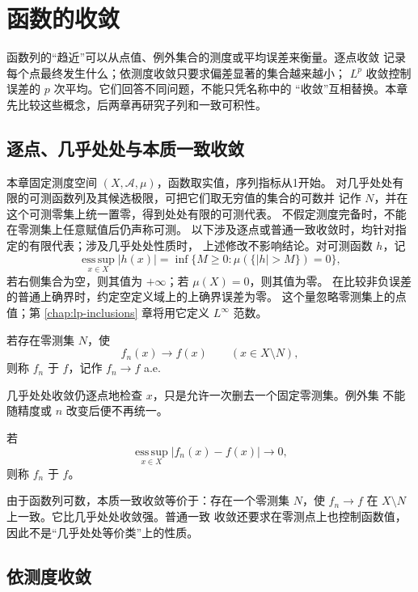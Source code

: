 \chapter{函数的收敛}
\label{chap:modes-of-convergence}

函数列的“趋近”可以从点值、例外集合的测度或平均误差来衡量。逐点收敛
记录每个点最终发生什么；依测度收敛只要求偏差显著的集合越来越小；
\(L^p\) 收敛控制误差的 \(p\) 次平均。它们回答不同问题，不能只凭名称中的
“收敛”互相替换。本章先比较这些概念，后两章再研究子列和一致可积性。

\section{逐点、几乎处处与本质一致收敛}

本章固定测度空间 \((X,\mathcal A,\mu)\)，函数取实值，序列指标从1开始。
对几乎处处有限的可测函数列及其候选极限，可把它们取无穷值的集合的可数并
记作 \(N\)，并在这个可测零集上统一置零，得到处处有限的可测代表。
不假定测度完备时，不能在零测集上任意赋值后仍声称可测。
以下涉及逐点或普通一致收敛时，均针对指定的有限代表；涉及几乎处处性质时，
上述修改不影响结论。对可测函数 \(h\)，记
\[
 \operatorname*{ess\,sup}_{x\in X}|h(x)|
 =\inf\{M\ge0:\mu(\{|h|>M\})=0\},
\]
若右侧集合为空，则其值为 \(+\infty\)；若 \(\mu(X)=0\)，则其值为零。
在比较非负误差的普通上确界时，约定空定义域上的上确界误差为零。
这个量忽略零测集上的点值；第
\ref{chap:lp-inclusions} 章将用它定义 \(L^\infty\) 范数。

\begin{definition}
若存在零测集 \(N\)，使
\[
 f_n(x)\longrightarrow f(x)\qquad(x\in X\setminus N),
\]
则称 \(f_n\) 于 \(f\)，记作
\(f_n\to f\) a.e.
\end{definition}

几乎处处收敛仍逐点地检查 \(x\)，只是允许一次删去一个固定零测集。例外集
不能随精度或 \(n\) 改变后便不再统一。

\begin{definition}
若
\[
 \operatorname*{ess\,sup}_{x\in X}|f_n(x)-f(x)|
 \longrightarrow0,
\]
则称 \(f_n\) 于 \(f\)。
\end{definition}

由于函数列可数，本质一致收敛等价于：存在一个零测集 \(N\)，使
\(f_n\to f\) 在 \(X\setminus N\) 上一致。它比几乎处处收敛强。普通一致
收敛还要求在零测点上也控制函数值，因此不是“几乎处处等价类”上的性质。

\section{依测度收敛}


